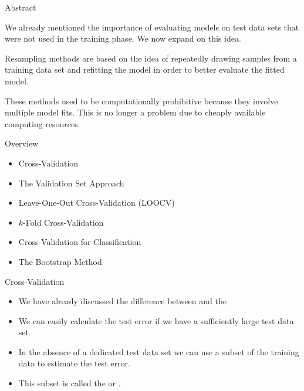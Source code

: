 \documentclass[mathserif, aspectratio=169]{beamer}
\subtitle{\bfseries%
  {Resampling Methods}\\%
  {\tiny\it Cross-Validation for Regression, Cross-Validation for Classification, Bootstrap}\\%
}
\begin{document}


\begin{frame}{Abstract}
	\begin{blurb}
		We already mentioned the importance of evaluating models on test data sets that
		were not used in the training phase. We now expand on this idea.

		Resampling methods are based on the idea of repeatedly drawing samples from a training
		data set and refitting the model in order to better evaluate the fitted model.

		These methods used to be computationally prohibitive because they involve multiple
		model fits. This is no longer a problem due to cheaply available computing resources.
	\end{blurb}
\end{frame}

\begin{frame}{Overview}
	\begin{itemize}
		\item Cross-Validation
		\item The Validation Set Approach 
		\item Leave-One-Out Cross-Validation (LOOCV)
		\item $k$-Fold Cross-Validation
		\item Cross-Validation for Classification
		\item The Bootstrap Method
	\end{itemize}
\end{frame}

\begin{frame}{Cross-Validation}
	\begin{itemize}
		\item We have already discussed the difference between  
			and the 
		\item We can easily calculate the test error if we have a sufficiently large 
			test data set.
		\item In the absence of a dedicated test data set we can use a subset of the
			training data to estimate the test error.
		\item This subset is called the  or .
	\end{itemize}
\end{frame}
\end{document}
